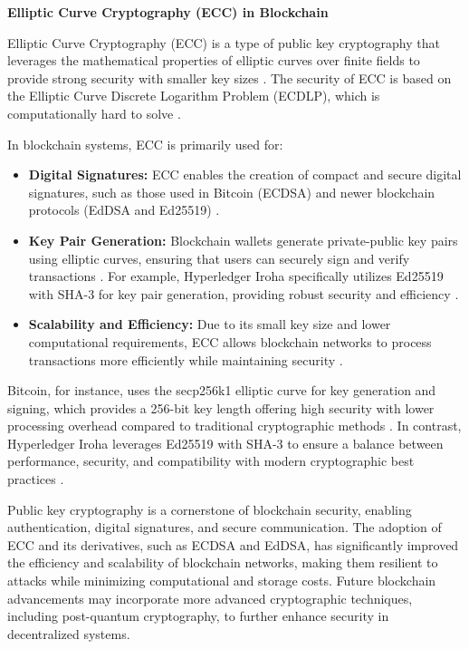 \documentclass[final]{rc-book-2.14}
\begin{document}
\textbf{Elliptic Curve Cryptography (ECC) in Blockchain}

Elliptic Curve Cryptography (ECC) is a type of public key cryptography that leverages the mathematical properties of elliptic curves over finite fields to provide strong security with smaller key sizes \cite{koblitz1987elliptic}. The security of ECC is based on the Elliptic Curve Discrete Logarithm Problem (ECDLP), which is computationally hard to solve \cite{hankerson2006guide}.

In blockchain systems, ECC is primarily used for:

\begin{itemize}
    \item \textbf{Digital Signatures:} ECC enables the creation of compact and secure digital signatures, such as those used in Bitcoin (ECDSA) and newer blockchain protocols (EdDSA and Ed25519) \cite{johnson2001elliptic, bernstein2012high}.
    \item \textbf{Key Pair Generation:} Blockchain wallets generate private-public key pairs using elliptic curves, ensuring that users can securely sign and verify transactions \cite{wu2018blockchain}. For example, Hyperledger Iroha specifically utilizes Ed25519 with SHA-3 for key pair generation, providing robust security and efficiency \cite{hyperledger_iroha}.
    \item \textbf{Scalability and Efficiency:} Due to its small key size and lower computational requirements, ECC allows blockchain networks to process transactions more efficiently while maintaining security \cite{fan2018analysis}.
\end{itemize}

Bitcoin, for instance, uses the secp256k1 elliptic curve for key generation and signing, which provides a 256-bit key length offering high security with lower processing overhead compared to traditional cryptographic methods \cite{brown2010standards}. In contrast, Hyperledger Iroha leverages Ed25519 with SHA-3 to ensure a balance between performance, security, and compatibility with modern cryptographic best practices \cite{hyperledger_iroha}.

Public key cryptography is a cornerstone of blockchain security, enabling authentication, digital signatures, and secure communication. The adoption of ECC and its derivatives, such as ECDSA and EdDSA, has significantly improved the efficiency and scalability of blockchain networks, making them resilient to attacks while minimizing computational and storage costs. Future blockchain advancements may incorporate more advanced cryptographic techniques, including post-quantum cryptography, to further enhance security in decentralized systems.
\end{document}
